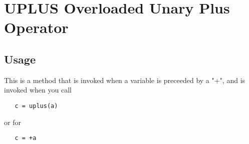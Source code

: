 \section{UPLUS Overloaded Unary Plus Operator}

\subsection{Usage}

This is a method that is invoked when a variable is preceeded by a "+",
and is invoked when you call
\begin{verbatim}
   c = uplus(a)
\end{verbatim}
or for 
\begin{verbatim}
   c = +a
\end{verbatim}

